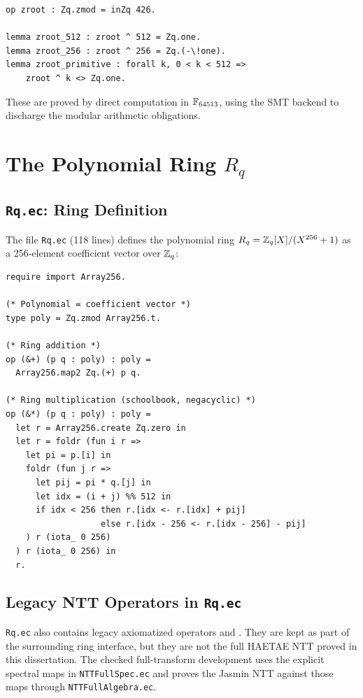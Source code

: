 \begin{lstlisting}[language=EasyCrypt,
  caption={Primitive root declaration in NTTFullAlgebra.ec},
  label={lst:zroot}]
op zroot : Zq.zmod = inZq 426.

lemma zroot_512 : zroot ^ 512 = Zq.one.
lemma zroot_256 : zroot ^ 256 = Zq.(-\!one).
lemma zroot_primitive : forall k, 0 < k < 512 =>
    zroot ^ k <> Zq.one.
\end{lstlisting}

These are proved by direct computation in $\mathbb{F}_{64513}$, using the SMT
backend to discharge the modular arithmetic obligations.

\section[The Polynomial Ring Rq]{The Polynomial Ring $R_q$}

\subsection{\texttt{Rq.ec}: Ring Definition}

The file \texttt{Rq.ec} (118 lines) defines the polynomial ring
$R_q = \mathbb{Z}_q[X]/(X^{256}+1)$ as a 256-element coefficient vector over $\mathbb{Z}_q$:

\begin{lstlisting}[language=EasyCrypt,
  caption={Ring definition in \texttt{Rq.ec}},
  label={lst:rq_def}]
require import Array256.

(* Polynomial = coefficient vector *)
type poly = Zq.zmod Array256.t.

(* Ring addition *)
op (&+) (p q : poly) : poly =
  Array256.map2 Zq.(+) p q.

(* Ring multiplication (schoolbook, negacyclic) *)
op (&*) (p q : poly) : poly =
  let r = Array256.create Zq.zero in
  let r = foldr (fun i r =>
    let pi = p.[i] in
    foldr (fun j r =>
      let pij = pi * q.[j] in
      let idx = (i + j) %% 512 in
      if idx < 256 then r.[idx <- r.[idx] + pij]
                   else r.[idx - 256 <- r.[idx - 256] - pij]
    ) r (iota_ 0 256)
  ) r (iota_ 0 256) in
  r.
\end{lstlisting}

\subsection{Legacy NTT Operators in \texttt{Rq.ec}}

\texttt{Rq.ec} also contains legacy axiomatized operators  and
.  They are kept as part of the surrounding ring interface, but
they are not the full HAETAE NTT proved in this dissertation.  The checked
full-transform development uses the explicit spectral maps in
\texttt{NTTFullSpec.ec} and proves the Jasmin NTT against those maps through
\texttt{NTTFullAlgebra.ec}.

